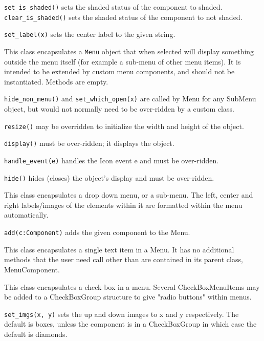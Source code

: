 \texttt{set\_is\_shaded()} sets the shaded status of the component to
shaded.\\
\texttt{clear\_is\_shaded()} sets the shaded status of the component to not
shaded.

\texttt{set\_label(x)} sets the center label to the given string.


This class encapsulates a \texttt{Menu} object that when selected will
display something outside the menu itself (for example a sub-menu of
other menu items). It is intended to be extended by custom menu
components, and should not be instantiated. Methods are empty.

\texttt{hide\_non\_menu()} and \texttt{set\_which\_open(x)} are called
by Menu for any SubMenu object,
but would not normally need to be over-ridden by a custom class.

\texttt{resize()} may be overridden to initialize the width and height
of the object.

\texttt{display()} must be over-ridden; it displays the object.

\texttt{handle\_event(e)} handles the Icon event e and must be over-ridden.

\texttt{hide()} hides (closes) the object's display and must be
over-ridden.


This class encapsulates a drop down menu, or a sub-menu. The left,
center and right labels/images of the elements within it are formatted
within the menu automatically.

\texttt{add(c:Component)} adds the given component to the Menu.


This class encapsulates a single text item in a Menu. It has no
additional methods that the user need call other than are contained in
its parent class, MenuComponent.


This class encapsulates a check box in a menu. Several CheckBoxMenuItems
may be added to a CheckBoxGroup structure to give "radio
buttons" within menus.

\texttt{set\_imgs(x, y)} sets the up and down images to x and y respectively.
The default is boxes, unless
the component is in a CheckBoxGroup in which case the
default is diamonds.


